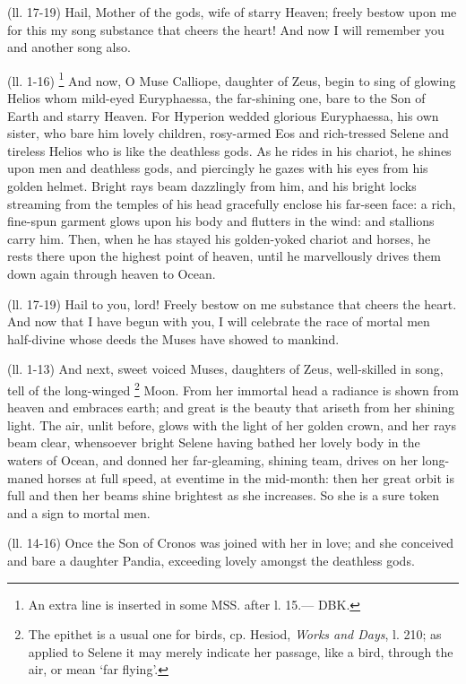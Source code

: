 (ll. 17-19) Hail, Mother of the gods, wife of starry Heaven; freely bestow upon
me for this my song substance that cheers the heart! And now I will remember
you and another song also.


(ll. 1-16) \footnote{An extra line is inserted
in some MSS. after l. 15.— DBK.} And now, O Muse Calliope,
daughter of Zeus, begin to sing of glowing Helios whom mild-eyed Euryphaessa,
the far-shining one, bare to the Son of Earth and starry Heaven. For Hyperion
wedded glorious Euryphaessa, his own sister, who bare him lovely children,
rosy-armed Eos and rich-tressed Selene and tireless Helios who is like the
deathless gods. As he rides in his chariot, he shines upon men and deathless
gods, and piercingly he gazes with his eyes from his golden helmet. Bright rays
beam dazzlingly from him, and his bright locks streaming from the temples of
his head gracefully enclose his far-seen face: a rich, fine-spun garment glows
upon his body and flutters in the wind: and stallions carry him. Then, when he
has stayed his golden-yoked chariot and horses, he rests there upon the highest
point of heaven, until he marvellously drives them down again through heaven to
Ocean.

(ll. 17-19) Hail to you, lord! Freely bestow on me substance that cheers the
heart. And now that I have begun with you, I will celebrate the race of mortal
men half-divine whose deeds the Muses have showed to mankind.


(ll. 1-13) And next, sweet voiced Muses, daughters of Zeus, well-skilled in
song, tell of the long-winged \footnote{The epithet is a usual one
for birds, cp. Hesiod, \emph{Works and Days}, l. 210; as applied to
Selene it may merely indicate her passage, like a bird, through the air, or
mean ‘far flying’.} Moon. From her immortal head a
radiance is shown from heaven and embraces earth; and great is the beauty that
ariseth from her shining light. The air, unlit before, glows with the light of
her golden crown, and her rays beam clear, whensoever bright Selene having
bathed her lovely body in the waters of Ocean, and donned her far-gleaming,
shining team, drives on her long-maned horses at full speed, at eventime in the
mid-month: then her great orbit is full and then her beams shine brightest as
she increases. So she is a sure token and a sign to mortal men.

(ll. 14-16) Once the Son of Cronos was joined with her in love; and she
conceived and bare a daughter Pandia, exceeding lovely amongst the deathless
gods.

